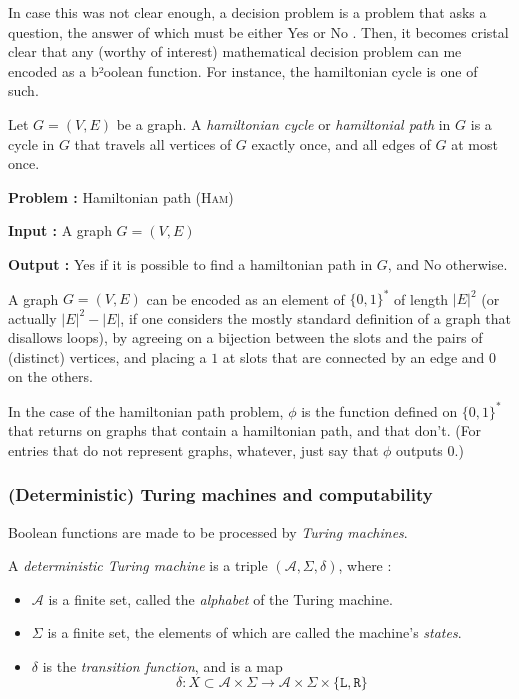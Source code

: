In case this was not clear enough, a decision problem is a problem that asks a question, the answer of which must be either \og Yes \fg or \og No \fg. Then, it becomes cristal clear that any (worthy of interest) mathematical decision problem can me encoded as a b²oolean function. For instance, the hamiltonian cycle is one of such.

\begin{definition}
    Let $ G = (V,E) $ be a graph. A \textit{hamiltonian cycle} or \textit{hamiltonial path} in $ G $ is a cycle in $ G $ that travels all vertices of $ G $ exactly once, and all edges of $ G $ at most once.
\end{definition}

\begin{problem}
    \textbf{Problem :} Hamiltonian path (\textsc{Ham})

    \textbf{Input :} A graph $ G = (V,E) $

    \textbf{Output :} \og Yes \fg if it is possible to find a hamiltonian path in $ G $, and \og No \fg otherwise.
\end{problem}

A graph $ G = (V,E) $ can be encoded as an element of $ \{ 0,1 \}^* $ of length $ |E|^2 $ (or actually $ |E|^2 - |E| $, if one considers the mostly standard definition of a graph that disallows loops), by agreeing on a bijection between the slots and the pairs of (distinct) vertices, and placing a $ 1 $ at slots that are connected by an edge and $ 0 $ on the others.

In the case of the hamiltonian path problem, $ \phi $ is the function defined on $ \{ 0,1 \}^* $ that returns  \fg on graphs that contain a hamiltonian path, and  \fg that don't. (For entries that do not represent graphs, whatever, just say that $ \phi $ outputs 0.)

\subsubsection{(Deterministic) Turing machines and computability}

Boolean functions are made to be processed by \textit{Turing machines}.

\begin{definition}
    A \textit{deterministic Turing machine} is a triple $ (\mathcal A, \Sigma, \delta) $, where :
    \begin{itemize}
        \item $ \mathcal A $ is a finite set, called the \textit{alphabet} of the Turing machine.
        \item $ \Sigma $ is a finite set, the elements of which are called the machine's \textit{states}.
        \item $ \delta $ is the \textit{transition function}, and is a map
        \[
        \delta : X \subset \mathcal A \times \Sigma \to \mathcal A \times \Sigma \times \{ \texttt{L}, \texttt{R}\}
        \]
    \end{itemize}
\end{definition}

